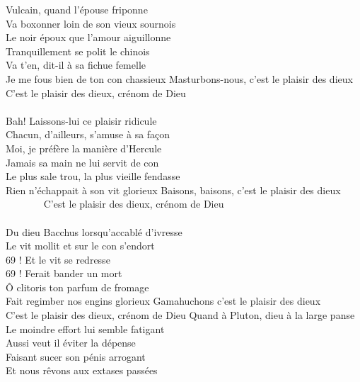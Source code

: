 %
 Vulcain, quand l'épouse friponne
\\Va boxonner loin de son vieux sournois
\\Le noir époux que l'amour aiguillonne
\\Tranquillement se polit le chinois
\\Va t'en, dit-il à sa fichue femelle
\\Je me fous bien de ton con chassieux
{Masturbons-nous, c'est le plaisir des dieux}
C'est le plaisir des dieux, crénom de Dieu
\\\\Bah! Laissons-lui ce plaisir ridicule
\\Chacun, d'ailleurs, s'amuse à sa façon
\\Moi, je préfère la manière d'Hercule
\\Jamais sa main ne lui servit de con
\\Le plus sale trou, la plus vieille fendasse
\\Rien n'échappait à son vit glorieux
{Baisons, baisons, c'est le plaisir des dieux  ~~~~~~~}
C'est le plaisir des dieux, crénom de Dieu
\\\\Du dieu Bacchus lorsqu'accablé d'ivresse
\\Le vit mollit et sur le con s'endort
\\69 ! Et le vit se redresse
\\69 ! Ferait bander un mort
\\Ô clitoris ton parfum de fromage
\\Fait regimber nos engins glorieux
{Gamahuchons c'est le plaisir des dieux  ~~~~~~~}
C'est le plaisir des dieux, crénom de Dieu
\breakpage
Quand à Pluton, dieu à la large panse
\\Le moindre effort lui semble fatigant
\\Aussi veut il éviter la dépense
\\Faisant sucer son pénis arrogant
\\Et nous rêvons aux extases passées
